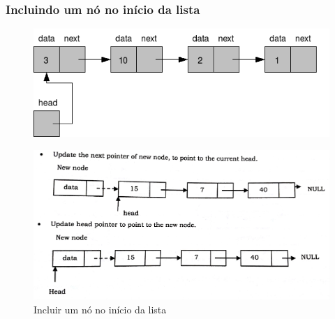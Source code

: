 \begin{frame}%
\frametitle{Incluindo um nó no início da lista}
\begin{figure}[!ht]
	\centering
	\includegraphics[height=0.30\paperheight, width=0.5\paperwidth]{figs/fig_listas/lista_encadeada01}
	\end{figure} 


\begin{figure}[!hb]
	\centering
		\includegraphics[height=0.50\paperheight, width=0.5\paperwidth]{figs/fig_listas/insere_inicio}			
			\caption{Incluir um nó no início da lista}	
			\end{figure} 


\end{frame} 

